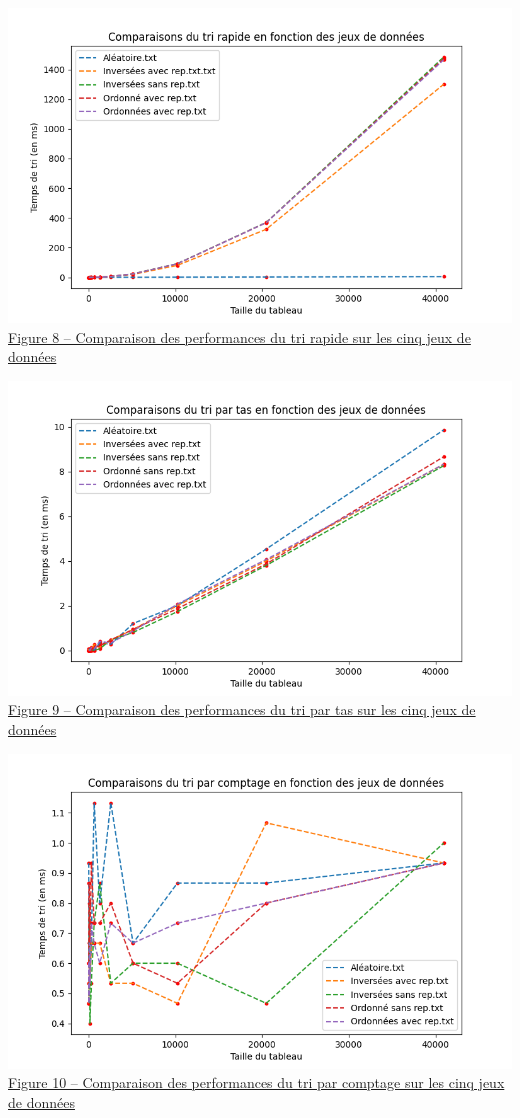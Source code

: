 \documentclass[11pt,a4paper]{article}
\begin{document}
\includegraphics[scale = 0.5]{Images/Courbes img/individuels/tri rapide.png}\\
\underline {Figure 8 – Comparaison des performances du tri rapide sur les cinq jeux de données}

\includegraphics[scale = 0.5]{Images/Courbes img/individuels/tri par tas.png}\\
\underline {Figure 9 – Comparaison des performances du tri par tas sur les cinq jeux de données}

\includegraphics[scale = 0.5]{Images/Courbes img/individuels/tri par comptage.png}\\
\underline {Figure 10 – Comparaison des performances du tri par comptage sur les cinq jeux de données}
\end{document}
